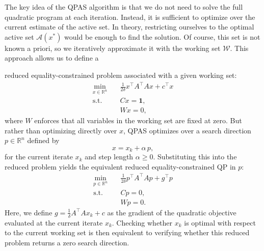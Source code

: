 \documentclass{book}
\theoremstyle{definition}
\newcounter{algorithm_}
\numberwithin{algorithm_}{chapter}
\begin{document}
The key idea of the QPAS algorithm is that we do not need to solve the full quadratic program at each iteration. Instead, it is sufficient to optimize over the current estimate of the active set. In theory, restricting ourselves to the optimal active set \(\mathcal{A}(x^*)\) would be enough to find the solution. Of course, this set is not known a priori, so we iteratively approximate it with the working set \(\mathcal{W}\).  
This approach allows us to define a {reduced equality-constrained problem associated with a given working set:
\begin{equation} \label{eq:reduced-problem-x}
\begin{aligned}
\min_{x \in \mathbb{R}^n} \quad & \frac{1}{2\delta} x^\top A^\top A x + c^\top x \\
\text{s.t.} \quad & C x = \mathbf{1}, \\
& W x = 0,
\end{aligned}
\end{equation}
where \(W\) enforces that all variables in the working set are fixed at zero. But rather than optimizing directly over \(x\), QPAS optimizes over a search direction \(p \in \mathbb{R}^n\) defined by
\begin{equation} \label{eq:search-direction}
x = x_k + \alpha \, p,
\end{equation}
for the current iterate \(x_k\) and step length \(\alpha \geq 0\). Substituting this into the reduced problem yields the equivalent reduced equality-constrained QP in \(p\):
\begin{equation} \label{eq:reduced-problem-p}
\begin{aligned}
\min_{p \in \mathbb{R}^n} \quad & \frac{1}{2\delta} p^\top A^\top A p + g^\top p \\
\text{s.t.} \quad & C p = 0, \\
& W p = 0.
\end{aligned}
\end{equation}
Here, we define $g = \frac{1}{\delta} A^\top A x_k + c$ as the gradient of the quadratic objective evaluated at the current iterate $x_k$. Checking whether \(x_k\) is optimal with respect to the current working set is then equivalent to verifying whether this reduced problem returns a zero search direction.

\bigskip

}
\end{document}
